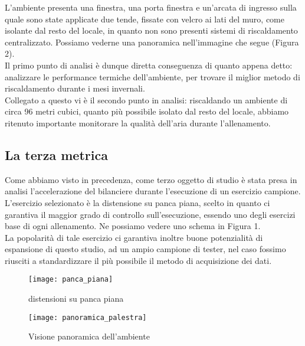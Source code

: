 \documentclass[fleqn,10pt]{SelfArx} %
\begin{document}
L'ambiente presenta una finestra, una porta finestra e un'arcata di ingresso sulla quale sono state applicate 
due tende, fissate con velcro ai lati del muro, come isolante dal resto del locale, in quanto non 
sono presenti sistemi di riscaldamento centralizzato. Possiamo vederne una panoramica nell'immagine che segue 
(Figura 2). \\

Il primo punto di analisi è dunque diretta conseguenza di quanto appena detto: analizzare le performance 
termiche dell'ambiente, per trovare il miglior metodo di riscaldamento durante i mesi invernali.\\
Collegato a questo vi è il secondo punto in analisi: riscaldando un ambiente di circa 96 metri cubici, quanto 
più possibile isolato dal resto del locale, abbiamo ritenuto importante monitorare la qualità dell'aria 
durante l'allenamento.

\subsection{La terza metrica}
Come abbiamo visto in precedenza, come terzo oggetto di studio è stata presa in analisi l'accelerazione del bilanciere 
durante l'esecuzione di un esercizio campione.\\
L'esercizio selezionato è la distensione su panca piana, scelto in quanto ci garantiva il maggior grado di controllo 
sull'esecuzione, essendo uno degli esercizi base di ogni allenamento. Ne possiamo vedere uno schema in Figura 1.\\

La popolarità di tale esercizio ci garantiva inoltre buone potenzialità di espansione di questo studio, ad un 
ampio campione di tester, nel caso fossimo riusciti a standardizzare il più possibile il metodo di acquisizione dei dati.

\begin{figure}[htb!]\centering
	\texttt{[image: panca\_piana]}
	\caption{distensioni su panca piana}
	\label{fig:panca_piana}
\end{figure}

\begin{figure*}[ht]\centering %
	\texttt{[image: panoramica\_palestra]}
	\caption{Visione panoramica dell'ambiente}
	\label{fig:view}
\end{figure*}
\end{document}
